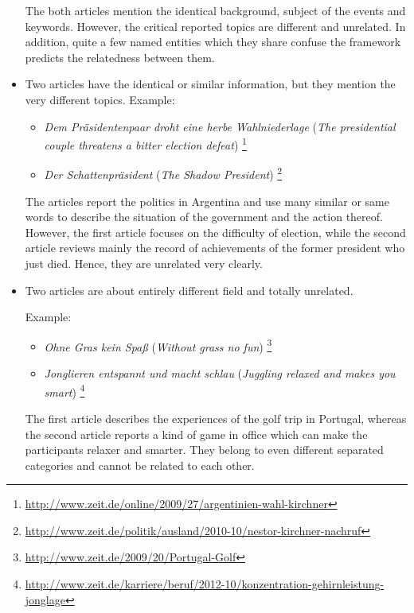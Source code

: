 \begin{itemize}
    The both articles mention the identical background, subject of the events and keywords. However, the critical reported topics are different and unrelated. In addition, quite a few named entities which they share confuse the framework predicts the relatedness between them. 
    
    \item Two articles have the identical or similar information, but they mention the very different topics. 
    Example: 
    \begin{itemize}
        \item \textit{Dem Pr\"asidentenpaar droht eine herbe Wahlniederlage} (\textit{The presidential couple threatens a bitter election defeat}) \footnote{\url{http://www.zeit.de/online/2009/27/argentinien-wahl-kirchner}}
        \item \textit{Der Schattenpr\"asident} (\textit{The Shadow President}) \footnote{\url{http://www.zeit.de/politik/ausland/2010-10/nestor-kirchner-nachruf}}
    \end{itemize}
    The articles report the politics in Argentina and use many similar or same words to describe the situation of the government and the action thereof. However, the first article focuses on the difficulty of election, while the second article reviews mainly the record of achievements of the former president who just died. Hence, they are unrelated very clearly. 
    
    \item Two articles are about entirely different field and totally unrelated. 
    
    Example: 
    \begin{itemize}
        \item \textit{Ohne Gras kein Spa\ss{}} (\textit{Without grass no fun}) \footnote{\url{http://www.zeit.de/2009/20/Portugal-Golf}}
        \item \textit{Jonglieren entspannt und macht schlau} (\textit{Juggling relaxed and makes you smart}) \footnote{\url{http://www.zeit.de/karriere/beruf/2012-10/konzentration-gehirnleistung-jonglage}}
    \end{itemize}
    
    The first article describes the experiences of the golf trip in Portugal, whereas the second article reports a kind of game in office which can make the participants relaxer and smarter. They belong to even different separated categories and cannot be related to each other. 
\end{itemize}


